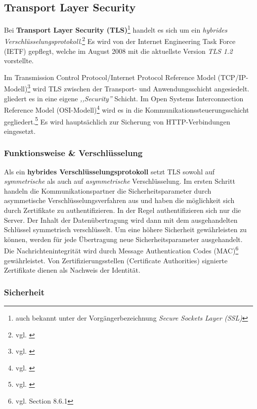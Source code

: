 \documentclass[12pt,a4paper,pointednumbers,abstracton]{scrartcl}
\begin{document}
\subsection{Transport Layer Security}

Bei \textbf{Transport Layer Security (TLS)}\footnote{auch bekannt unter der Vorgängerbezeichnung \emph{Secure Sockets Layer (SSL)}} handelt es sich um ein \emph{hybrides Verschlüsselungsprotokoll}.\footnote{vgl. \cite[Hannes Federrath, Andreas Pfitzmann: ,,IT-Sicherheit''. Kapitel 2.4 (S. 279-281)]{WK06}}
Es wird von der Internet Engineering Task Force (IETF) gepflegt, welche im August 2008 mit \cite{RFC5246} die aktuellste Version \emph{TLS 1.2} vorstellte.

Im Transmission Control Protocol/Internet Protocol Reference Model (TCP/IP-Modell)\footnote{vgl. \cite[Section 1.4.2]{TW10}} wird TLS zwischen der Transport- und Anwendungsschicht angesiedelt.
\cite[Section 8.9.3]{TW10} gliedert es in eine eigene \emph{,,Security''} Schicht.
Im Open Systems Interconnection Reference Model (OSI-Modell)\footnote{vgl. \cite[Section 1.4.1]{TW10}} wird es in die Kommunikationssteuerungsschicht gegliedert.\footnote{vgl. \cite[Section 12.4]{Sin12}}
Es wird hauptsächlich zur Sicherung von HTTP-Verbindungen eingesetzt.

\subsubsection{Funktionsweise \& Verschlüsselung}

Als ein \textbf{hybrides Verschlüsselungsprotokoll} setzt TLS sowohl auf \emph{symmetrische} als auch auf \emph{asymmetrische} Verschlüsselung.
Im ersten Schritt handeln die Kommunikationspartner die Sicherheitsparameter durch asymmetische Verschlüsselungsverfahren aus und haben die möglichkeit sich durch Zertifikate zu authentifizieren.
In der Regel authentifizieren sich nur die Server.
Der Inhalt der Datenübertragung wird dann mit dem ausgehandelten Schlüssel symmetrisch verschlüsselt.
Um eine höhere Sicherheit gewährleisten zu können, werden für jede Übertragung neue Sicherheitsparameter ausgehandelt.
Die Nachrichtenintegrität wird durch Message Authentication Codes (MAC)\footnote{vgl. \cite{TW10} Section 8.6.1} gewährleistet.
Von Zertifizierungsstellen (Certificate Authorities) signierte Zertifikate dienen als Nachweis der Identität.

\subsubsection{Sicherheit}
\label{sec:basics-security}
\end{document}
